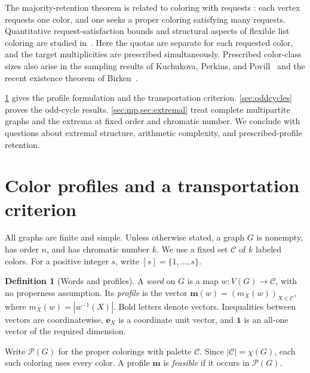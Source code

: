 \documentclass[11pt,reqno]{amsart}
\numberwithin{equation}{section}
\theoremstyle{definition}
\newtheorem{definition}[theorem]{Definition}
\theoremstyle{remark}
\begin{document}
The majority-retention theorem is related to coloring with requests
\cite{dvorak2019}: each vertex requests one color, and one seeks a
proper coloring satisfying many requests. Quantitative request-satisfaction
bounds and structural aspects of flexible list coloring are studied
in~\cite{Kaul2024,Bowdoin2025}.
Here the quotas are separate for each requested color, and the target
multiplicities are prescribed simultaneously. Prescribed color-class
sizes also arise in the sampling results of Kuchukova, Perkins, and
Povill~\cite{Kuchukova2026} and the recent existence theorem of
Birken~\cite{Birken2026}.

\cref{sec:preliminaries} gives the profile formulation and the
transportation criterion. \cref{sec:oddcycles} proves the
odd-cycle results. \cref{sec:mp,sec:extremal}
treat complete multipartite graphs and the extrema at fixed order
and chromatic number. We conclude with questions about extremal
structure, arithmetic complexity, and prescribed-profile retention.

\section{Color profiles and a transportation criterion}\label{sec:preliminaries}

All graphs are finite and simple. Unless otherwise stated, a graph $G$ is
nonempty, has order $n$, and has chromatic number $k$. We use a fixed set
$\mathcal C$ of $k$ labeled colors. For a positive integer $s$, write
$[s]=\{1,\ldots,s\}$.

\begin{definition}[Words and profiles]\label{def:profile}
A \emph{word} on $G$ is a map
$w:V(G)\to\mathcal C$, with no properness assumption. Its \emph{profile}
is the vector $\mathbf m(w)=(m_X(w))_{X\in\mathcal C}$, where
$m_X(w)=|w^{-1}(X)|$. Bold letters denote vectors. Inequalities between
vectors are coordinatewise, $\mathbf e_X$ is a coordinate unit vector,
and $\mathbf1$ is an all-one vector of the required dimension.

Write $\mathcal P(G)$ for the proper colorings with palette $\mathcal C$.
Since $|\mathcal C|=\chi(G)$, each such coloring uses every color. A profile
$\mathbf m$ is \emph{feasible} if it occurs in $\mathcal P(G)$.
\end{definition}
\end{document}
